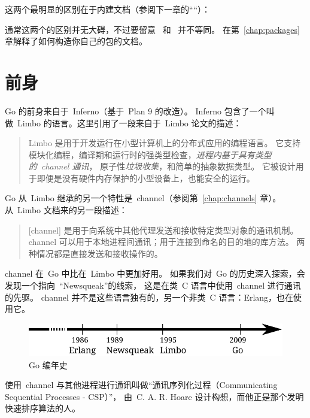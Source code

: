这两个最明显的区别在于内建文档（参阅下一章的````）：
\begin{display}
\pr {}   
\pr {}    
\end{display}

通常这两个的区别并无大碍，不过要留意~ 和~ 并不等同。
在第~\ref{chap:packages} 章解释了如何构造你自己的包的文档。

\section{前身}
Go 的前身来自于~Inferno\cite{inferno}（基于~Plan 9\cite{plan9} 的改造）。
Inferno 包含了一个叫做~Limbo\cite{limbo} 的语言。这里引用了一段来自于~Limbo 论文的描述：
\begin{quote}
Limbo 是用于开发运行在小型计算机上的分布式应用的编程语言。
它支持模块化编程，编译期和运行时的强类型检查，\emph{进程内基于具有类型的~channel 通讯}，
原子性\emph{垃圾收集}，和简单的抽象数据类型。
它被设计用于即便是没有硬件内存保护的小型设备上，也能安全的运行。
\end{quote}
Go 从~Limbo 继承的另一个特性是~channel（参阅第~\ref{chap:channels} 章）。
从~Limbo 文档来的另一段描述：
\begin{quote}
[channel] 是用于向系统中其他代理发送和接收特定类型对象的通讯机制。
channel 可以用于本地进程间通讯；用于连接到命名的目的地的库方法。
两种情况都是直接发送和接收操作的。
\end{quote}
channel 在~Go 中比在~Limbo 中更加好用。
如果我们对~Go 的历史深入探索，会发现一个指向~``Newsqueak\cite{newsqueak}''的线索，
这是在类~C 语言中使用~channel 进行通讯的先驱。
channel 并不是这些语言独有的，另一个非类~C 语言：Erlang\cite{erlang}，也在使用它。

\begin{figure}[H]
\caption{Go 编年史}
\label{fig:chrono-of-go}
\begin{center}
\includegraphics[scale=0.65]{fig/go-history.pdf}
\end{center}
\end{figure}

使用~channel 与其他进程进行通讯叫做``通讯序列化过程（Communicating Sequential Processes - CSP）''，
由~C. A. R. Hoare\cite{hoare} 设计构想，而他正是那个发明快速排序\cite{quicksort}算法的人。

